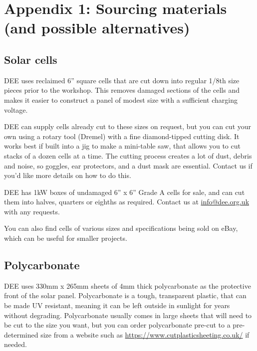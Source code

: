 \documentclass{article}
\theoremstyle{definition}
\theoremstyle{definition}
\theoremstyle{remark}
\begin{document}


\newpage

{\color{blue}\section{Appendix 1: Sourcing materials (and possible alternatives)}} %
\label{sec:appendix_1_sourcing_materials_and_possible_alternatives_}

  \subsection*{Solar cells} %
  \label{sub:solar_cells}

    DEE uses reclaimed 6” square cells that are cut down into regular 1/8th size pieces prior to the workshop. This removes damaged sections of the cells and makes it easier to construct a panel of modest size with a sufficient charging voltage. 

    DEE can supply cells already cut to these sizes on request, but you can cut your own using a rotary tool (Dremel) with a fine diamond-tipped cutting disk. It works best if built into a jig to make a mini-table saw, that allows you to cut stacks of a dozen cells at a time. The cutting process creates a lot of dust, debris and noise, so goggles, ear protectors, and a dust mask are essential. Contact us if you'd like more details on how to do this.

    DEE has 1kW boxes of undamaged 6” x 6” Grade A cells for sale, and can cut them into halves, quarters or eighths as required. Contact us at \href{mailto:info@dee.org.uk}{info@dee.org.uk} with any requests.

    You can also find cells of various sizes and specifications being sold on eBay, which can be useful for smaller projects.
  

  \subsection*{Polycarbonate} %
  \label{sub:polycarbonate}

    DEE uses 330mm x 265mm sheets of 4mm thick polycarbonate as the protective front of the solar panel. Polycarbonate is a tough, transparent plastic, that can be made UV resistant, meaning it can be left outside in sunlight for years without degrading. Polycarbonate usually comes in large sheets that will need to be cut to the size you want, but you can order polycarbonate pre-cut to a pre-determined size from a website such as \href{https://www.cutplasticsheeting.co.uk/clear-acrylic-sheeting/clear-polycarbonate-sheet}{https://www.cutplasticsheeting.co.uk/} if needed.
\end{document}
